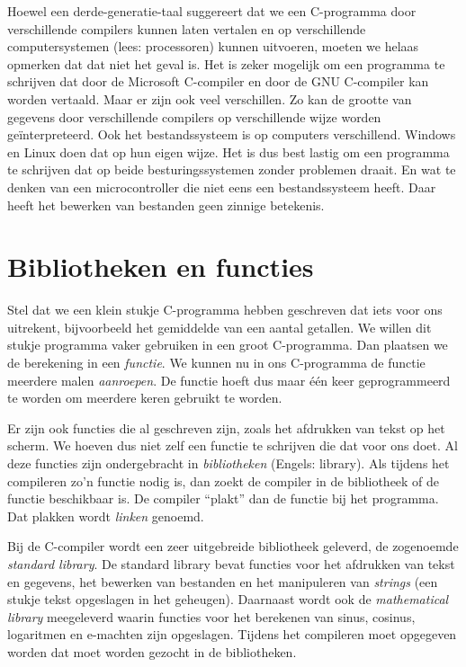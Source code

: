 Hoewel een derde-generatie-taal suggereert dat we een C-programma door verschillende compilers kunnen laten vertalen en op verschillende computersystemen (lees: processoren) kunnen uitvoeren, moeten we helaas opmerken dat dat niet het geval is. Het is zeker mogelijk om een programma te schrijven dat door de Microsoft C-compiler en door de GNU C-compiler kan worden vertaald. Maar er zijn ook veel verschillen. Zo kan de grootte van gegevens door verschillende compilers op verschillende wijze worden geïnterpreteerd. Ook het bestandssysteem is op computers verschillend. Windows en Linux doen dat op hun eigen wijze. Het is dus best lastig om een programma te schrijven dat op beide besturingssystemen zonder problemen draait. En wat te denken van een microcontroller die niet eens een bestandssysteem heeft. Daar heeft het bewerken van bestanden geen zinnige betekenis.


\section{Bibliotheken en functies}
Stel dat we een klein stukje C-programma hebben geschreven dat iets voor ons uitrekent, bijvoorbeeld het gemiddelde van een aantal getallen. We willen dit stukje programma vaker gebruiken in een groot C-programma. Dan plaatsen we de berekening in een \textsl{functie}. We kunnen nu in ons C-programma de functie meerdere malen \textsl{aanroepen}. De functie hoeft dus maar één keer geprogrammeerd te worden om meerdere keren gebruikt te worden.

Er zijn ook functies die al geschreven zijn, zoals het afdrukken van tekst op het scherm. We hoeven dus niet zelf een functie te schrijven die dat voor ons doet. Al deze functies zijn ondergebracht in \textsl{bibliotheken} (Engels: library). Als tijdens het compileren zo'n functie nodig is, dan zoekt de compiler in de bibliotheek of de functie beschikbaar is. De compiler ``plakt'' dan de functie bij het programma. Dat plakken wordt \textsl{linken} genoemd.

Bij de C-compiler wordt een zeer uitgebreide bibliotheek geleverd, de zogenoemde \textsl{standard library}. De standard library bevat functies voor het afdrukken van tekst en gegevens, het bewerken van bestanden en het manipuleren van \textsl{strings} (een stukje tekst opgeslagen in het geheugen). Daarnaast wordt ook de \textsl{mathematical library} meegeleverd waarin functies voor het berekenen van sinus, cosinus, logaritmen en e-machten zijn opgeslagen. Tijdens het compileren moet opgegeven worden dat moet worden gezocht in de bibliotheken.


